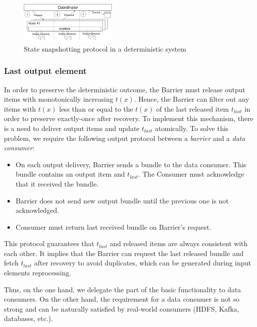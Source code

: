 \begin{figure}[htbp]
  \centering
  \includegraphics[width=0.42\textwidth]{pics/protocol-fs}
  \caption{State snapshotting protocol in a deterministic system}
  \label{protocol_fs}
\end{figure}

\subsubsection{Last output element}

In order to preserve the deterministic outcome, the Barrier must release output items with monotonically increasing $t(x)$. Hence, the Barrier can filter out any items with $t(x)$ less than or equal to the $t(x)$ of the last released item $t_{last}$ in order to preserve exactly-once after recovery. To implement this mechanism, there is a need to deliver output items and update $t_{last}$ atomically. To solve this problem, we require the following output protocol between a {\em barrier} and a {\em data consumer}: 

\begin{itemize}
    \item On each output delivery, Barrier sends a bundle to the data consumer. This bundle contains an output item and $t_{last}$. The Consumer must acknowledge that it received the bundle.
    \item Barrier does not send new output bundle until the previous one is not acknowledged.
    \item Consumer must return last received bundle on Barrier's request.
\end{itemize}

This protocol guarantees that $t_{last}$ and released items are always consistent with each other. It implies that the Barrier can request the last released bundle and fetch $t_{last}$ after recovery to avoid duplicates, which can be generated during input elements reprocessing.

Thus, on the one hand, we delegate the part of the basic functionality to data consumers. On the other hand, the requirement for a data consumer is not so strong and can be naturally satisfied by real-world consumers (HDFS, Kafka, databases, etc.). 

